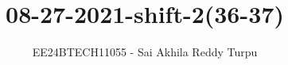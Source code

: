 \documentclass[journal]{IEEEtran}
\begin{document}

\vspace{3cm}

\title{08-27-2021-shift-2(36-37)}
\author{EE24BTECH11055 - Sai Akhila Reddy Turpu}
{\let\newpage\relax\maketitle}



\renewcommand{\thefigure}{\theenumi}
\renewcommand{\thetable}{\theenumi}
\setlength{\intextsep}{10pt} %


\renewcommand{\thetable}{\theenumi}
\end{document}
